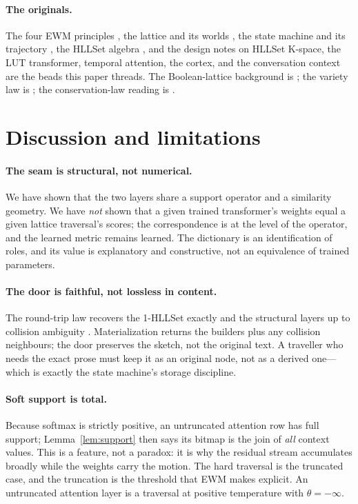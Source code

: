 \documentclass[11pt,a4paper]{article}
\theoremstyle{remark}
\begin{document}
\paragraph{The originals.} The four EWM principles \cite{ewm2026}, the lattice
and its worlds \cite{companion2026}, the state machine and its trajectory
\cite{state2026}, the HLLSet algebra \cite{astesj2026}, and the design notes on
HLLSet K-space, the LUT transformer, temporal attention, the cortex, and the
conversation context
\cite{kspace2026,luttransformer2026,roadmap2026,cortex2026,ctx2026} are the
beads this paper threads. The Boolean-lattice background is \cite{birkhoff1940};
the variety law is \cite{ashby1952}; the conservation-law reading is
\cite{noether1918}.

\section{Discussion and limitations}
\label{sec:discussion}

\paragraph{The seam is structural, not numerical.} We have shown that the two
layers share a support operator and a similarity geometry. We have
\emph{not} shown that a given trained transformer's weights equal a given
lattice traversal's scores; the correspondence is at the level of the operator,
and the learned metric remains learned. The dictionary is an identification of
roles, and its value is explanatory and constructive, not an equivalence of
trained parameters.

\paragraph{The door is faithful, not lossless in content.} The round-trip law
recovers the 1-HLLSet exactly and the structural layers up to collision
ambiguity \cite{ctx2026}. Materialization returns the builders plus any
collision neighbours; the door preserves the sketch, not the original text. A
traveller who needs the exact prose must keep it as an original node, not as a
derived one---which is exactly the state machine's storage discipline.

\paragraph{Soft support is total.} Because softmax is strictly positive, an
untruncated attention row has full support; Lemma~\ref{lem:support} then says
its bitmap is the join of \emph{all} context values. This is a feature, not a
paradox: it is why the residual stream accumulates broadly while the weights
carry the motion. The hard traversal is the truncated case, and the truncation
is the threshold that EWM makes explicit. An untruncated attention layer is a
traversal at positive temperature with $\theta=-\infty$.
\end{document}
